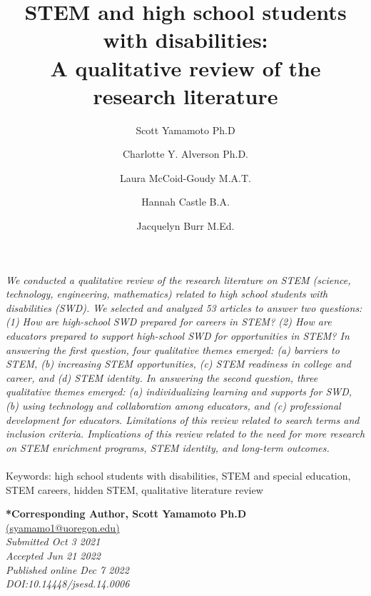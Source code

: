 \documentclass[11.5pt]{sig-alternate}
\makeatletter
\let\oldabstract\abstract
\let\oldendabstract\endabstract
\renewenvironment{abstract}
{\renewenvironment{quotation}%
               {\list{}{\addtolength{\leftmargin}{1em} %
                        \listparindent 1.5em%
                        \itemindent    \listparindent%
                        \rightmargin   \leftmargin%
                        \parsep        \z@ \@plus\p@}%
                \item\relax}%
               {\endlist}%
\oldabstract}
{\oldendabstract}
\makeatother
\begin{document}
\title{STEM and high school students with disabilities:\\
A qualitative review of the research literature 
}

\author[1]{\large \color{blue}Scott Yamamoto Ph.D}
\author[1]{\large \color{blue}Charlotte Y. Alverson Ph.D.}
\author[1]{\large \color{blue}Laura McCoid-Goudy M.A.T.}
\author[1]{\large \color{blue}Hannah Castle B.A.}
\author[1]{\large \color{blue}Jacquelyn Burr M.Ed.}

\toappear{}
\maketitle
\begin{@twocolumnfalse} 
\begin{abstract}
\item 
 \textit {We conducted a qualitative review of the research literature on STEM (science, technology, engineering, mathematics) related to high school students with disabilities (SWD). We selected and analyzed 53 articles to answer two questions: (1) How are high-school SWD prepared for careers in STEM? (2) How are educators prepared to support high-school SWD for opportunities in STEM? In answering the first question, four qualitative themes emerged: (a) barriers to STEM, (b) increasing STEM opportunities, (c) STEM readiness in college and career, and (d) STEM identity. In answering the second question, three qualitative themes emerged: (a) individualizing learning and supports for SWD, (b) using technology and collaboration among educators, and (c) professional development for educators. Limitations of this review related to search terms and inclusion criteria. Implications of this review related to the need for more research on STEM enrichment programs, STEM identity, and long-term outcomes.}
     \\
     \\
     Keywords: high school students with disabilities, STEM and special education, STEM careers, hidden STEM, qualitative literature review
\end{abstract}
\end{@twocolumnfalse}


\textbf{*Corresponding Author, Scott Yamamoto Ph.D}\\
\href{mailto: syamamo1@uoregon.edu }{(syamamo1@uoregon.edu)} \\
\textit{Submitted  Oct 3 2021 }\\
\textit{Accepted Jun 21 2022} \\
\textit{Published online  Dec 7 2022} \\
\textit{DOI:10.14448/jsesd.14.0006} \\
\end{document}
